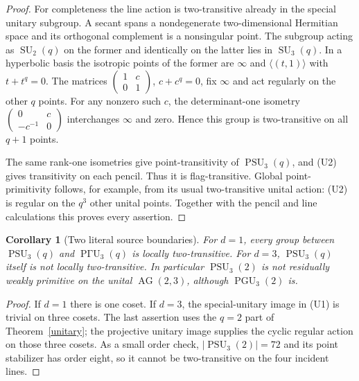 \documentclass[11pt,a4paper]{article}
\newtheorem{corollary}[theorem]{Corollary}
\newcommand{\PSU}{\operatorname{PSU}}
\newcommand{\PGU}{\operatorname{PGU}}
\newcommand{\PGammaU}{\operatorname{P\Gamma U}}
\begin{document}
\begin{proof}
For completeness the line action is two-transitive already in the special
unitary subgroup. A secant spans a nondegenerate two-dimensional Hermitian
space and its orthogonal complement is a nonsingular point. The subgroup
acting as $\operatorname{SU}_2(q)$ on the former and identically on the
latter lies in $\operatorname{SU}_3(q)$. In a hyperbolic basis the isotropic
points of the former are $\infty$ and $\langle(t,1)\rangle$ with
$t+t^q=0$. The matrices $\left(\begin{smallmatrix}1&c\\0&1\end{smallmatrix}\right)$,
$c+c^q=0$, fix $\infty$ and act regularly on the other $q$ points.
For any nonzero such $c$, the determinant-one isometry
$\left(\begin{smallmatrix}0&c\\-c^{-1}&0\end{smallmatrix}\right)$ interchanges
$\infty$ and zero. Hence this group is two-transitive on all $q+1$ points.

The same rank-one isometries give point-transitivity of $\PSU_3(q)$,
and (U2) gives transitivity on each pencil. Thus it is flag-transitive.
Global point-primitivity follows, for example, from its usual two-transitive
unital action: (U2) is regular on the $q^3$ other unital points. Together
with the pencil and line calculations this proves every assertion.
\end{proof}

\begin{corollary}[Two literal source boundaries]
For $d=1$, every group between $\PSU_3(q)$ and $\PGammaU_3(q)$ is locally
two-transitive. For $d=3$, $\PSU_3(q)$ itself is not locally two-transitive.
In particular $\PSU_3(2)$ is not residually weakly primitive on the unital
$\operatorname{AG}(2,3)$, although $\PGU_3(2)$ is.
\end{corollary}
\begin{proof}
If $d=1$ there is one coset. If $d=3$, the special-unitary image in (U1)
is trivial on three cosets. The last assertion uses the $q=2$ part of
Theorem~\ref{unitary}; the projective unitary image supplies the cyclic
regular action on those three cosets. As a small order check,
$|\PSU_3(2)|=72$ and its point stabilizer has order eight, so it cannot
be two-transitive on the four incident lines.
\end{proof}


\end{document}
